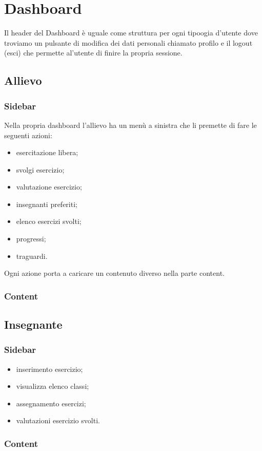 \section{Dashboard}
Il header del Dashboard è uguale come struttura per ogni tipoogia  d'utente dove troviamo un pulsante di modifica dei dati personali chiamato profilo e il logout (esci) che permette al'utente  di finire la propria sessione.
\subsection{Allievo}
\subsubsection{Sidebar}
Nella propria dashboard l'allievo ha un menù a sinistra che li premette di fare le seguenti azioni:
\begin{itemize}
\item esercitazione libera;
\item svolgi esercizio;
\item valutazione esercizio;
\item insegnanti preferiti;
\item elenco esercizi svolti;
\item progressi;
\item traguardi.
\end{itemize}
Ogni azione porta a caricare un contenuto diverso nella parte content.
\subsubsection{Content}
\subsection{Insegnante}
\subsubsection{Sidebar}
\begin{itemize}
\item inserimento esercizio;
\item visualizza elenco classi;
\item assegnamento esercizi;
\item valutazioni esercizio svolti.
\end{itemize}

\subsubsection{Content}
